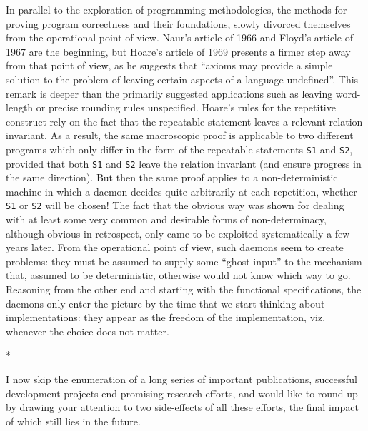 \documentclass[10pt,letterpaper,twocolumn]{article}
\newcommand{\stardiv}{\medskip\centerline{*\quad*\quad*}\medskip\noindent\ignorespaces}
\begin{document}
In parallel to the exploration of programming 
methodologies, the methods for proving program 
correctness and their foundations, slowly divorced 
themselves from the operational point of view. 
Naur's article of 1966 and Floyd's article of 1967 
are the beginning, but Hoare's article of 1969 
presents a firmer step away from that point of 
view, as he suggests that ``axioms may provide a 
simple solution to the problem of leaving certain 
aspects of a language undefined''. This remark is 
deeper than the primarily suggested applications 
such as leaving word-length or precise rounding 
rules unspecified. Hoare's rules for the repetitive 
construct rely on the fact that the repeatable 
statement leaves a relevant relation invariant. As 
a result, the same macroscopic proof is applicable 
to two different programs which only differ in the 
form of the repeatable statements \texttt{S1} and \texttt{S2},
provided that both \texttt{S1} and \texttt{S2} leave the relation
invarlant (and ensure progress in the same 
direction). But then the same proof applies to 
a non-deterministic machine in which a daemon 
decides quite arbitrarily at each repetition, 
whether \texttt{S1} or \texttt{S2} will be chosen! The fact 
that the obvious way was shown for dealing with 
at least some very common and desirable forms of 
non-determinacy, although obvious in retrospect, 
only came to be exploited systematically a few 
years later. From the operational point of view, 
such daemons seem to create problems: they must be 
assumed to supply some ``ghost-input'' to the mechanism that, assumed to be deterministic, otherwise 
would not know which way to go. Reasoning from the 
other end and starting with the functional specifications, the daemons only enter the picture by 
the time that we start thinking about implementations: they appear as
the freedom of the implementation, viz. whenever the choice does not matter.

\stardiv

I now skip the enumeration of a long series 
of important publications, successful development 
projects end promising research efforts, and would 
like to round up by drawing your attention to two 
side-effects of all these efforts, the final impact of which still lies in the future. 
\end{document}
